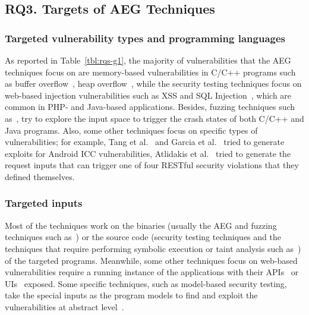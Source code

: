 \subsection{RQ3. Targets of AEG Techniques}

\subsubsection{Targeted vulnerability types and programming languages}
As reported in Table~\ref{tbl:rqs-g1}, the majority of vulnerabilities that the AEG techniques focus on are memory-based vulnerabilities in C/C++ programs such as buffer overflow~\cite{Xu2022, shahriar2009automatic, DelGrosso20083125, Dixit2021}, heap overflow~\cite{Huang2019}, while the security testing techniques focus on web-based injection vulnerabilities such as XSS and SQL Injection~\cite{Bozic202020, zhang2010d, aydin2014automated, Huang2013208}, which are common in PHP- and Java-based applications.
Besides, fuzzing techniques such as~\cite{Bohme2019489, Yu2022, KallingalJoshy2021540}, try to explore the input space to trigger the crash states of both C/C++ and Java programs.
Also, some other techniques focus on specific types of vulnerabilities; for example, Tang et al.~\cite{Tang2017492} and Garcia et al.~\cite{Garcia2017661} tried to generate exploits for Android ICC vulnerabilities, Atlidakis et al.~\cite{Atlidakis2020387} tried to generate the request inputs that can trigger one of four RESTful security violations that they defined themselves.

\subsubsection{Targeted inputs}
Most of the techniques work on the binaries (usually the AEG and fuzzing techniques such as~\cite{Liu2018705, Liu202271, Gong2022374, Zhang201946}) or the source code (security testing techniques and the techniques that require performing symbolic execution or taint analysis such as~\cite{Chen20201580, DelGrosso20083125, avancini2012security, dao2011security, wu2018fuze}) of the targeted programs. Meanwhile, some other techniques focus on web-based vulnerabilities require a running instance of the applications with their APIs~\cite{Appelt2014259, Jan201612, Atlidakis2020387} or UIs~\cite{Simos2019122, Liu2016123, Bozic2020115, Huang2013208} exposed. Some specific techniques, such as model-based security testing, take the special inputs as the program models to find and exploit the vulnerabilities at abstract level~\cite{Pretschner2008338, Lebeau2013445, Khamaiseh2017534}.